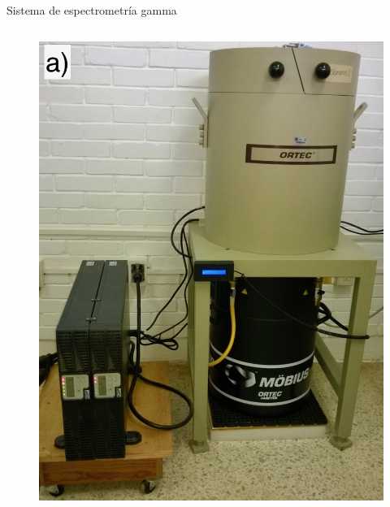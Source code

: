 \documentclass[9pt]{beamer}
\begin{document}
\begin{frame}{Sistema de espectrometría gamma}
	\begin{columns}
		\begin{column}{0.45\textwidth}
			\begin{figure}
			\centering
			\includegraphics[height=0.45\textheight]{Imagenes/GammaSystem.jpg}

\end{figure}
\end{column}
\end{columns}
\end{frame}
\end{document}
